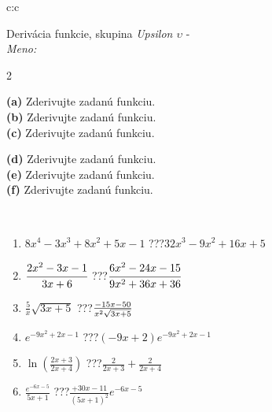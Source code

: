 \documentclass[10pt]{report}
\begin{document}
\newpage
\thispagestyle{empty}
\begin{tabular}{c:c}
\begin{minipage}[c][104.5mm][t]{0.5\linewidth}
\begin{center}
\vspace{7mm}
{\huge Derivácia funkcie, skupina \textit{Upsilon $\upsilon$} -}\\[5mm]
\textit{Meno:}\phantom{xxxxxxxxxxxxxxxxxxxxxxxxxxxxxxxxxxxxxxxxxxxxxxxxxxxxxxxxxxxxxxxxx}\\[5mm]
\begin{minipage}{0.95\linewidth}
\begin{center}
{\small \begin{multicols}{2} \raggedright
\textbf{(a)} Zderivujte zadanú funkciu. \\[1mm]
\textbf{(b)} Zderivujte zadanú funkciu. \\[1mm]
\textbf{(c)} Zderivujte zadanú funkciu. \par \columnbreak
\textbf{(d)} Zderivujte zadanú funkciu. \\[1mm]
\textbf{(e)} Zderivujte zadanú funkciu. \\[1mm]
\textbf{(f)} Zderivujte zadanú funkciu.
\end{multicols}
}
\end{center}
\end{minipage}
\\[4mm]
\begin{minipage}{0.79\linewidth}
\begin{center}
\begin{varwidth}{\linewidth}
\begin{enumerate}
\normalsize
\item $8x^4-3x^3+8x^2+5x-1$\quad \dotfill\; ???\;\dotfill \quad $32x^3-9x^2+16x+5$
\item $\cfrac{2x^2-3x-1}{3x+6}$\quad \dotfill\; ???\;\dotfill \quad $\cfrac{6x^2-24x-15}{9x^2+36x+36}$
\item $\frac{5}{x}\sqrt{3x+5}$\quad \dotfill\; ???\;\dotfill \quad $\frac{-15x-50}{x^2 \sqrt{\smash[b]{3x+5}}}$
\item $e^{-9x^2+2x-1}$\quad \dotfill\; ???\;\dotfill \quad $(-9x+2)e^{-9x^2+2x-1}$
\item $\ln{\left(\frac{2x+3}{2x+4}\right)}$\quad \dotfill\; ???\;\dotfill \quad $\frac{2}{2x+3}+\frac{2}{2x+4}$
\item $\frac{e^{-6x-5}}{5x+1}$\quad \dotfill\; ???\;\dotfill \quad $\frac{+30x-11}{(5x+1)^2}e^{-6x-5}$
\end{enumerate}

\end{varwidth}
\end{center}
\end{minipage}
\end{center}
\end{minipage}
\end{tabular}
\end{document}
